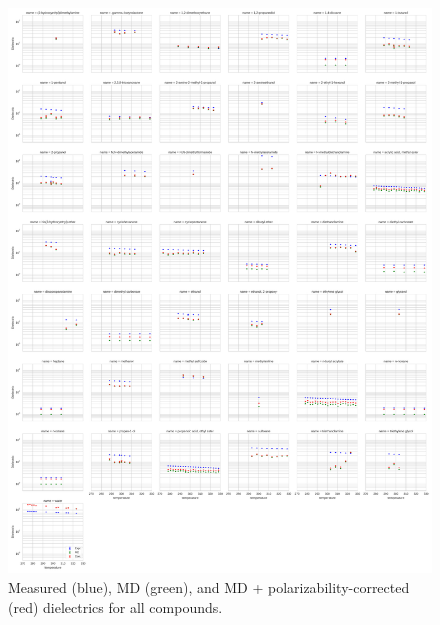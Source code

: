 \documentclass[journal=jacsat,manuscript=article]{achemso}
\begin{document}
\begin{figure}

\includegraphics[width=\columnwidth]{./figures/dielectric_versus_temperature_all.pdf}

\caption{Measured (blue), MD (green), and MD + polarizability-corrected (red) dielectrics for all compounds.
}
\label{figure:AllDielectrics}

\end{figure}




\end{document}
